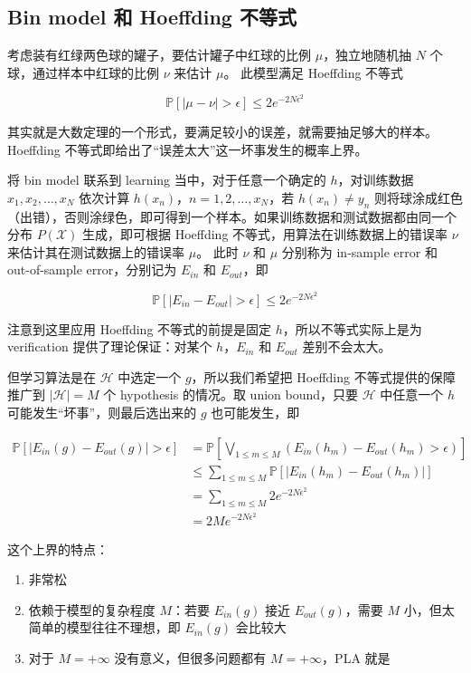 \documentclass[a4paper]{article}
\begin{document}
\subsection{Bin model 和 Hoeffding 不等式}
考虑装有红绿两色球的罐子，要估计罐子中红球的比例 $\mu$，独立地随机抽 $N$ 个球，通过样本中红球的比例 $\nu$ 来估计 $\mu$。
此模型满足 Hoeffding 不等式

$$\mathbb{P}[|\mu - \nu| > \epsilon] \le 2e^{-2N\epsilon^2}$$

其实就是大数定理的一个形式，要满足较小的误差，就需要抽足够大的样本。Hoeffding 不等式即给出了“误差太大”这一坏事发生的概率上界。

将 bin model 联系到 learning 当中，对于任意一个确定的 $h$，对训练数据 ${x_1, x_2, \dots, x_N}$ 依次计算 $h(x_n)$，$n = 1, 2, \dots, x_N$，若 $h(x_n) \neq y_n$ 则将球涂成红色（出错），否则涂绿色，即可得到一个样本。如果训练数据和测试数据都由同一个分布 $P(\mathcal{X})$ 生成，即可根据 Hoeffding 不等式，用算法在训练数据上的错误率 $\nu$ 来估计其在测试数据上的错误率 $\mu$。
此时 $\nu$ 和 $\mu$ 分别称为 in-sample error 和 out-of-sample error，分别记为 $E_{in}$ 和 $E_{out}$，即

\begin{equation}
\label{hoeffding-ein-eout}
\mathbb{P}[|E_{in} - E_{out}| > \epsilon] \le 2e^{-2N\epsilon^2}
\end{equation}

注意到这里应用 Hoeffding 不等式的前提是固定 $h$，所以不等式实际上是为 verification 提供了理论保证：对某个 $h$，$E_{in}$ 和 $E_{out}$ 差别不会太大。

但学习算法是在 $\mathcal{H}$ 中选定一个 $g$，所以我们希望把 Hoeffding 不等式提供的保障推广到 $|\mathcal{H}| = M$ 个 hypothesis
的情况。取 union bound，只要 $\mathcal{H}$ 中任意一个 $h$ 可能发生“坏事”，则最后选出来的 $g$ 也可能发生，即

\begin{align*}
\mathbb{P}[|E_{in}(g) - E_{out}(g)| > \epsilon] &= \mathbb{P}[\bigvee_{1 \le m \le M}\left(E_{in}(h_m) - E_{out}(h_m) > \epsilon \right)] \\
												&\le \sum_{1 \le m \le M}\mathbb{P}[|E_{in}(h_m) - E_{out}(h_m)|] \\
												&=   \sum_{1 \le m \le M}2e^{-2N\epsilon^2} \\
												&= 2Me^{-2N\epsilon^2}
\end{align*}

这个上界的特点：
\begin{enumerate}
  \item 非常松
  \item 依赖于模型的复杂程度 $M$：若要 $E_{in}(g)$ 接近 $E_{out}(g)$，需要 $M$ 小，但太简单的模型往往不理想，即 $E_{in}(g)$ 会比较大
  \item 对于 $M = +\infty$ 没有意义，但很多问题都有 $M = +\infty$，PLA 就是
\end{enumerate}
\end{document}
